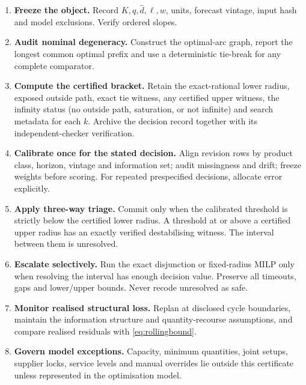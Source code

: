 \documentclass[11pt]{article}
\theoremstyle{definition}
\newcommand{\dhat}{\widehat d}
\newcommand{\ellv}{\ell}
\begin{document}
\begin{enumerate}[label=\textbf{Step \arabic*.},leftmargin=5.2em,itemsep=0.45em]
\item \textbf{Freeze the object.} Record $K,q,\dhat,\ellv,w$, units, forecast vintage, input hash and model exclusions. Verify ordered slopes.
\item \textbf{Audit nominal degeneracy.} Construct the optimal-arc graph, report the longest common optimal prefix and use a deterministic tie-break for any complete comparator.
\item \textbf{Compute the certified bracket.} Retain the exact-rational lower radius, exposed outside path, exact tie witness, any certified upper witness, the infinity status (no outside path, saturation, or not infinite) and search metadata for each $k$. Archive the decision record together with its independent-checker verification.
\item \textbf{Calibrate once for the stated decision.} Align revision rows by product class, horizon, vintage and information set; audit missingness and drift; freeze weights before scoring. For repeated prespecified decisions, allocate error explicitly.
\item \textbf{Apply three-way triage.} Commit only when the calibrated threshold is strictly below the certified lower radius. A threshold at or above a certified upper radius has an exactly verified destabilising witness. The interval between them is unresolved.
\item \textbf{Escalate selectively.} Run the exact disjunction or fixed-radius MILP only when resolving the interval has enough decision value. Preserve all timeouts, gaps and lower/upper bounds. Never recode unresolved as safe.
\item \textbf{Monitor realised structural loss.} Replan at disclosed cycle boundaries, maintain the information structure and quantity-recourse assumptions, and compare realised residuals with \eqref{eq:rollingbound}.
\item \textbf{Govern model exceptions.} Capacity, minimum quantities, joint setups, supplier locks, service levels and manual overrides lie outside this certificate unless represented in the optimisation model.
\end{enumerate}
\end{document}
